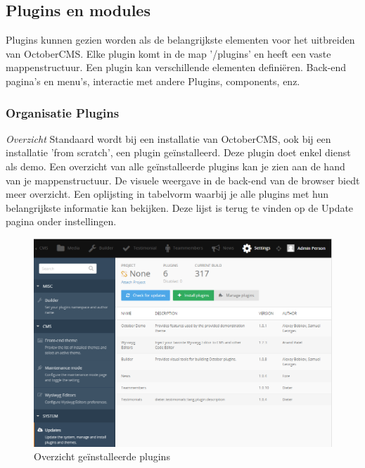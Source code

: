 \subsection{Plugins en modules}
Plugins kunnen gezien worden als de belangrijkste elementen voor het uitbreiden van OctoberCMS. Elke plugin komt in de map '/plugins' en heeft een vaste mappenstructuur. Een plugin kan verschillende elementen definiëren. Back-end pagina's en menu's, interactie met andere Plugins, components, enz.

\subsubsection{Organisatie Plugins}

\textit{Overzicht} \newline
Standaard wordt bij een installatie van OctoberCMS, ook bij een installatie 'from scratch', een plugin geïnstalleerd. Deze plugin doet enkel dienst als demo. Een overzicht van alle geïnstalleerde plugins kan je zien aan de hand van je mappenstructuur. De visuele weergave in de back-end van de browser biedt meer overzicht. Een oplijsting in tabelvorm waarbij je alle plugins met hun belangrijkste informatie kan bekijken. Deze lijst is terug te vinden op de Update pagina onder instellingen. 

\begin{figure}[!ht]
  \includegraphics[width=\linewidth]{img/oc-plugin-updates.png}
  \caption{Overzicht geïnstalleerde plugins}
  \label{fig:Overzicht geïnstalleerde plugins}
\end{figure}

